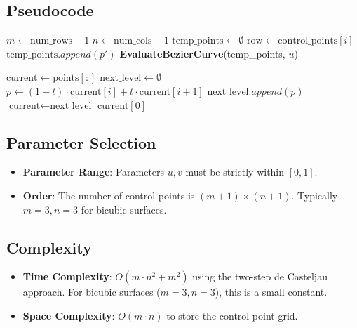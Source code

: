\subsection{Pseudocode}
\begin{algorithm}
\caption{Evaluate B\'ezier Surface}
\label{alg:evaluate_bezier_surface}
\begin{algorithmic}[1]
    \State $m \gets \text{num\_rows} - 1$
    \State $n \gets \text{num\_cols} - 1$
    \State $\text{temp\_points} \gets \emptyset$
        \State $\text{row} \gets \text{control\_points}[i]$
        \State {}
        \State $\text{temp\_points}.append(p')$
    \EndFor
    \State \Return \textbf{EvaluateBezierCurve}(temp\_points, $u$)
\EndFunction

    \State $\text{current} \gets \text{points}[:]$
        \State $\text{next\_level} \gets \emptyset$
            \State $p \gets (1 - t) \cdot \text{current}[i] + t \cdot \text{current}[i+1]$
            \State $\text{next\_level}.append(p)$
        \EndFor
        \State $\text{current} \gets \text{next\_level}$
    \EndWhile
    \State \Return $\text{current}[0]$
\EndFunction
\end{algorithmic}
\end{algorithm}

\subsection{Parameter Selection}
\begin{itemize}
\item \textbf{Parameter Range}: Parameters $u, v$ must be strictly within $[0, 1]$.
\item \textbf{Order}: The number of control points is $(m+1) \times (n+1)$. Typically $m=3, n=3$ for bicubic surfaces.
\end{itemize}

\subsection{Complexity}
\begin{itemize}
\item \textbf{Time Complexity}: $O(m \cdot n^2 + m^2)$ using the two-step de Casteljau approach. For bicubic surfaces ($m=3, n=3$), this is a small constant.
\item \textbf{Space Complexity}: $O(m \cdot n)$ to store the control point grid.
\end{itemize}

